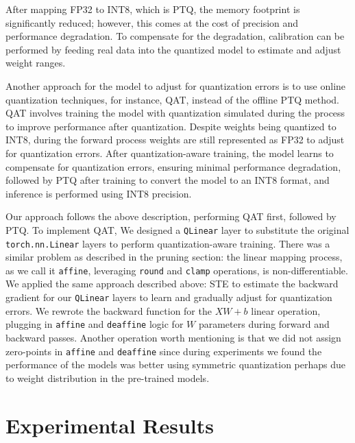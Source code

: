 \documentclass{article}
\begin{document}
    \hspace*{1em} After mapping FP32 to INT8, which is PTQ, the memory footprint is significantly reduced; however, this comes at the cost of precision and performance degradation. To compensate for the degradation, calibration can be performed by feeding real data into the quantized model to estimate and adjust weight ranges.

    \hspace*{1em} Another approach for the model to adjust for quantization errors is to use online quantization techniques, for instance, QAT, instead of the offline PTQ method. QAT involves training the model with quantization simulated during the process to improve performance after quantization. Despite weights being quantized to INT8, during the forward process weights are still represented as FP32 to adjust for quantization errors. After quantization-aware training, the model learns to compensate for quantization errors, ensuring minimal performance degradation, followed by PTQ after training to convert the model to an INT8 format, and inference is performed using INT8 precision.

    \hspace*{1em} Our approach follows the above description, performing QAT first, followed by PTQ. To implement QAT, We designed a \texttt{QLinear} layer to substitute the original \texttt{torch.nn.Linear} layers to perform quantization-aware training. There was a similar problem as described in the pruning section: the linear mapping process, as we call it \texttt{affine}, leveraging \texttt{round} and \texttt{clamp} operations, is non-differentiable. We applied the same approach described above: STE to estimate the backward gradient for our \texttt{QLinear} layers to learn and gradually adjust for quantization errors. We rewrote the backward function for the $XW + b$ linear operation, plugging in \texttt{affine} and \texttt{deaffine} logic for $W$ parameters during forward and backward passes. Another operation worth mentioning is that we did not assign zero-points in \texttt{affine} and \texttt{deaffine} since during experiments we found the performance of the models was better using symmetric quantization perhaps due to weight distribution in the pre-trained models.


    \section{Experimental Results}
\end{document}
